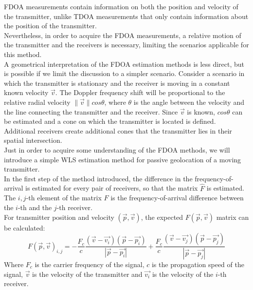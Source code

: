\documentclass[10pt,a4paper]{report}
\begin{document}
FDOA measurements contain information on both the position and velocity of the transmitter, unlike TDOA measurements that only contain information about the position of the transmitter. \\
Nevertheless, in order to acquire the FDOA measurements, a relative motion of the transmitter and the receivers is necessary, limiting the scenarios applicable for this method.\\

A geometrical interpretation of the FDOA estimation methods is less direct, but is possible if we limit the discussion to a simpler scenario. Consider a scenario in which the transmitter is stationary and the receiver is moving in a constant known velocity $\vec{v}$. The Doppler frequency shift will be proportional to the relative radial velocity $\|\vec{v}\|cos\theta$, where $\theta$ is the angle between the velocity and the line connecting the transmitter and the receiver. Since $\vec{v}$ is known, $cos\theta$ can be estimated and a cone on which the transmitter is located is defined.\\
Additional receivers create additional cones that the transmitter lies in their spatial intersection.\\

Just in order to acquire some understanding of the FDOA methods, we will introduce a simple WLS estimation method for passive geolocation of a moving transmitter.\\

In the first step of the method introduced, the difference in the frequency-of-arrival is estimated for every pair of receivers, so that the matrix $\hat{F}$ is estimated. The $i,j$-th element of the matrix $\hat{F}$ is the frequency-of-arrival difference between the $i$-th and the $j$-th receiver.\\

For transmitter position and velocity $(\vec{p},\vec{v})$, the expected $F(\vec{p},\vec{v})$ matrix can be calculated:
\begin{equation}
F(\vec{p},\vec{v})_{i,j} = -\frac{F_c}{c}\frac{(\vec{v}-\vec{v_i})(\vec{p}-\vec{p_i})}{|\vec{p}-\vec{p_i}|}+\frac{F_c}{c}\frac{(\vec{v}-\vec{v_j})(\vec{p}-\vec{p_j})}{|\vec{p}-\vec{p_j}|}
\end{equation}
Where $F_c$ is the carrier frequency of the signal, $c$ is the propagation speed of the signal, $\vec{v}$ is the velocity of the transmitter and $\vec{v_i}$ is the velocity of the $i$-th receiver.\\
\end{document}
